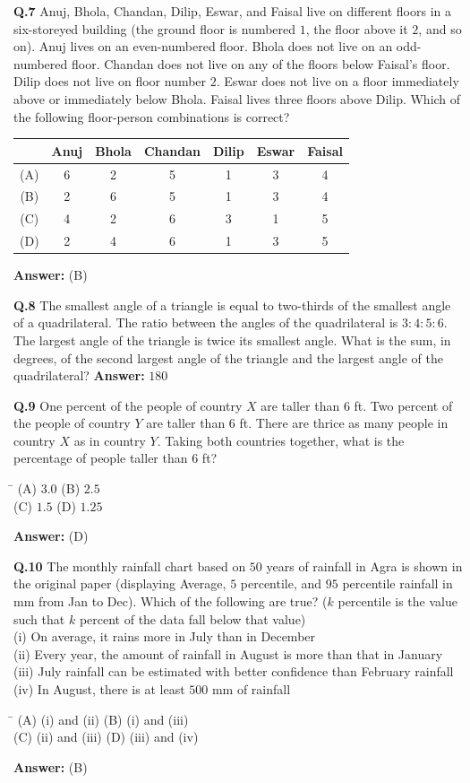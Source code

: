 \documentclass[11pt,a4paper]{article}
\newcommand{\optsfourA}[4]{%
  \begin{tabbing}
    \hspace{0.48\linewidth}\=\kill
    (A) #1 \> (B) #2 \\[2pt]
    (C) #3 \> (D) #4
  \end{tabbing}%
}
\newcommand{\ans}[1]{\textbf{Answer:} #1\par\medskip}
\begin{document}
\textbf{Q.7} Anuj, Bhola, Chandan, Dilip, Eswar, and Faisal live on different floors in a six-storeyed building (the ground floor is numbered $1$, the floor above it $2$, and so on). Anuj lives on an even-numbered floor. Bhola does not live on an odd-numbered floor. Chandan does not live on any of the floors below Faisal's floor. Dilip does not live on floor number $2$. Eswar does not live on a floor immediately above or immediately below Bhola. Faisal lives three floors above Dilip. Which of the following floor-person combinations is correct?
\begin{center}
\begin{tabular}{ccccccc}
  \toprule
  & Anuj & Bhola & Chandan & Dilip & Eswar & Faisal \\
  \midrule
  (A) & 6 & 2 & 5 & 1 & 3 & 4 \\
  (B) & 2 & 6 & 5 & 1 & 3 & 4 \\
  (C) & 4 & 2 & 6 & 3 & 1 & 5 \\
  (D) & 2 & 4 & 6 & 1 & 3 & 5 \\
  \bottomrule
\end{tabular}
\end{center}
\ans{(B)}

\textbf{Q.8} The smallest angle of a triangle is equal to two-thirds of the smallest angle of a quadrilateral. The ratio between the angles of the quadrilateral is $3 : 4 : 5 : 6$. The largest angle of the triangle is twice its smallest angle. What is the sum, in degrees, of the second largest angle of the triangle and the largest angle of the quadrilateral? \underline{\hspace{2cm}}
\ans{$180$}

\textbf{Q.9} One percent of the people of country $X$ are taller than $6$ ft. Two percent of the people of country $Y$ are taller than $6$ ft. There are thrice as many people in country $X$ as in country $Y$. Taking both countries together, what is the percentage of people taller than $6$ ft?
\optsfourA{$3.0$}{$2.5$}{$1.5$}{$1.25$}
\ans{(D)}

\textbf{Q.10} The monthly rainfall chart based on $50$ years of rainfall in Agra is shown in the original paper (displaying Average, $5$ percentile, and $95$ percentile rainfall in mm from Jan to Dec). Which of the following are true? ($k$ percentile is the value such that $k$ percent of the data fall below that value)\\
(i) On average, it rains more in July than in December\\
(ii) Every year, the amount of rainfall in August is more than that in January\\
(iii) July rainfall can be estimated with better confidence than February rainfall\\
(iv) In August, there is at least $500$ mm of rainfall
\optsfourA{(i) and (ii)}{(i) and (iii)}{(ii) and (iii)}{(iii) and (iv)}
\ans{(B)}
\end{document}
